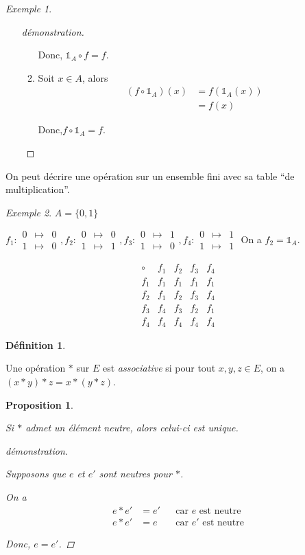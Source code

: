 \documentclass{report}
\newtheorem*{prop}{Proposition}
\theoremstyle{definition}
\newtheorem*{defin}{D\'efinition}
\theoremstyle{remark}
\newtheorem*{exem}{Exemple}
\begin{document}
\begin{exem}
\begin{itemize}
\begin{proof}[d\'emonstration]
\begin{enumerate}[label=(\arabic*)]
					Donc, $\mathds{1}_A \circ f=f$.
					\item Soit $x \in A$, alors
					\begin{align*}
						(f \circ \mathds{1}_A)(x)&= f(\mathds{1}_A(x))\\
						&=f(x)
					\end{align*}

					Donc,$f \circ \mathds{1}_A=f$.
				\end{enumerate}
			\end{proof}
		\end{itemize}
	\end{exem}

	On peut d\'ecrire une op\'eration sur un ensemble fini avec sa table ``de multiplication''.
	\begin{exem}
		$A=\{0,1\}$

		$f_1:\begin{array}{rcl}
			0&\mapsto&0\\
			1&\mapsto&0
		\end{array},f_2:\begin{array}{rcl}
			0&\mapsto&0\\
			1&\mapsto&1
		\end{array},f_3:\begin{array}{rcl}
			0&\mapsto&1\\
			1&\mapsto&0
		\end{array},f_4:\begin{array}{rcl}
			0&\mapsto&1\\
			1&\mapsto&1
		\end{array}$
		On a $f_2=\mathds{1}_A$.

		\[
		\begin{array}{c||c|c|c|c}
			\circ&f_1&f_2&f_3&f_4\\
			\hline\hline
			f_1&f_1&f_1&f_1&f_1\\
			\hline
			f_2&f_1&f_2&f_3&f_4\\
			\hline
			f_3&f_4&f_3&f_2&f_1\\
			\hline
			f_4&f_4&f_4&f_4&f_4
		\end{array}
		\]
	\end{exem}
	\begin{defin}
		~

		Une op\'eration $*$ sur $E$ est \emph{associative} si pour tout $x,y,z \in E$, on a $(x*y)*z=x*(y*z)$.
	\end{defin}
	\begin{prop}
		~

		Si $*$ admet un \'el\'ement neutre, alors celui-ci est \emph{unique}.
		\begin{proof}[d\'emonstration]~

			Supposons que $e$ et $e'$ sont neutres pour $*$.

			On a
			\begin{align*}
				e*e'&=e'&&\text{car $e$ est neutre}\\
				e*e'&=e&&\text{car $e'$ est neutre}
			\end{align*}

			Donc, $e=e'$.
		\end{proof}
	\end{prop}
\end{document}
